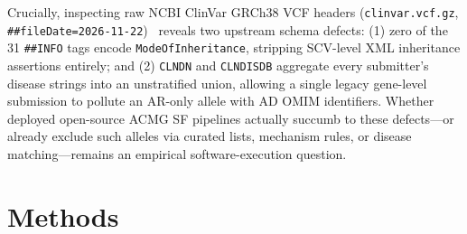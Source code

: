 \documentclass[11pt,letterpaper]{article}
\begin{document}
Crucially, inspecting raw NCBI ClinVar GRCh38 VCF headers (\texttt{clinvar.vcf.gz}, \texttt{\#\#fileDate=2026-11-22})~\citep{landrum2025clinvar} reveals two upstream schema defects: (1) zero of the 31 \texttt{\#\#INFO} tags encode \texttt{ModeOfInheritance}, stripping SCV-level XML inheritance assertions entirely; and (2) \texttt{CLNDN} and \texttt{CLNDISDB} aggregate every submitter's disease strings into an unstratified union, allowing a single legacy gene-level submission to pollute an AR-only allele with AD OMIM identifiers. Whether deployed open-source ACMG SF pipelines actually succumb to these defects---or already exclude such alleles via curated lists, mechanism rules, or disease matching---remains an empirical software-execution question.

\section{Methods}
\end{document}
